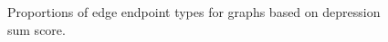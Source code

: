 \documentclass[
]{article}
\begin{document}
\begin{figure}


\caption{\label{fig-sum-mat}Proportions of edge endpoint types for
graphs based on depression sum score.}

\end{figure}%
\end{document}
